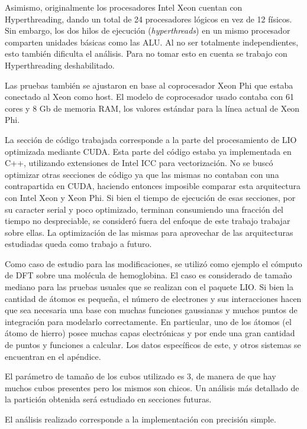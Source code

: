 Asimismo, originalmente los procesadores Intel Xeon cuentan con Hyperthreading,
dando un total de 24 procesadores l\'ogicos en vez de 12 f\'isicos.
Sin embargo, los dos hilos de ejecuci\'on (\textit{hyperthreads}) en un mismo
procesador comparten unidades b\'asicas como las ALU. Al no ser totalmente
independientes, esto tambi\'en dificulta el an\'alisis. Para no tomar esto en
cuenta se trabajo con Hyperthreading deshabilitado.

Las pruebas tambi\'en se ajustaron en base al coprocesador Xeon Phi que estaba
conectado al Xeon como host. El modelo de coprocesador usado contaba con 61
cores y 8 Gb de memoria RAM, los valores est\'andar para la l\'inea actual de
Xeon Phi.

La secci\'on de c\'odigo trabajada corresponde a la parte del procesamiento
de LIO optimizada mediante CUDA. Esta parte del c\'odigo estaba ya implementada
en C++, utilizando extensiones de Intel ICC para vectorizaci\'on. No se busc\'o
optimizar otras secciones de c\'odigo ya que las mismas no contaban con una
contrapartida en CUDA, haciendo entonces imposible comparar esta arquitectura con
Intel Xeon y Xeon Phi. Si bien el tiempo de ejecuci\'on de esas secciones, por su
caracter serial y poco optimizado, terminan consumiendo una fracci\'on del tiempo
no despreciable, se consider\'o fuera del enfoque de este trabajo trabajar sobre
ellas. La optimizaci\'on de las mismas para aprovechar de las arquitecturas
estudiadas queda como trabajo a futuro.

Como caso de estudio para las modificaciones, se utiliz\'o como ejemplo el c\'omputo
de DFT sobre una mol\'ecula de hemoglobina. El caso es considerado de tama\~no
mediano para las pruebas usuales que se realizan con el paquete LIO. Si bien la
cantidad de \'atomos es peque\~na, el n\'umero de electrones y sus interacciones
hacen que sea necesaria una base con muchas funciones gaussianas y muchos puntos de integraci\'on para
modelarlo correctamente. En particular, uno de los \'atomos (el \'atomo de hierro)
posee muchas capas electr\'onicas y por ende una gran cantidad de puntos y
funciones a calcular. Los datos espec\'ificos de este, y otros sistemas
se encuentran en el ap\'endice.

El par\'ametro de tama\~no de los cubos utilizado es 3, de manera de que hay muchos
cubos presentes pero los mismos son chicos. Un an\'alisis m\'as detallado de la
partici\'on obtenida ser\'a estudiado en secciones futuras.

El an\'alisis realizado corresponde a la implementaci\'on con precisi\'on simple.

